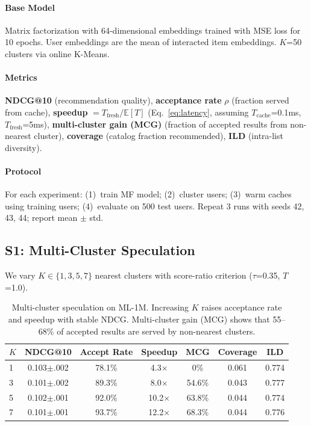 \documentclass{article}
\begin{document}
\paragraph{Base Model} Matrix factorization with 64-dimensional embeddings trained with MSE loss for 10 epochs. User embeddings are the mean of interacted item embeddings. $K$=50 clusters via online K-Means.

\paragraph{Metrics} \textbf{NDCG@10} (recommendation quality), \textbf{acceptance rate} $\rho$ (fraction served from cache), \textbf{speedup} $= T_{\text{fresh}} / \mathbb{E}[T]$ (Eq.~\ref{eq:latency}, assuming $T_{\text{cache}}$=0.1ms, $T_{\text{fresh}}$=5ms), \textbf{multi-cluster gain (MCG)} (fraction of accepted results from non-nearest cluster), \textbf{coverage} (catalog fraction recommended), \textbf{ILD} (intra-list diversity).

\paragraph{Protocol} For each experiment: (1)~train MF model; (2)~cluster users; (3)~warm caches using training users; (4)~evaluate on 500 test users. Repeat 3 runs with seeds 42, 43, 44; report mean $\pm$ std.

\subsection{S1: Multi-Cluster Speculation}
\label{sec:exp_s1}

We vary $K \in \{1, 3, 5, 7\}$ nearest clusters with score-ratio criterion ($\tau$=0.35, $T$=1.0).

\begin{table}[t]
\centering
\caption{Multi-cluster speculation on ML-1M. Increasing $K$ raises acceptance rate and speedup with stable NDCG. Multi-cluster gain (MCG) shows that 55--68\% of accepted results are served by non-nearest clusters.}
\label{tab:s1}
\small
\begin{tabular}{lcccccc}
\toprule
$K$ & NDCG@10 & Accept Rate & Speedup & MCG & Coverage & ILD \\
\midrule
1 & 0.103$\pm$.002 & 78.1\% & 4.3$\times$ & 0\% & 0.061 & 0.774 \\
3 & 0.101$\pm$.002 & 89.3\% & 8.0$\times$ & 54.6\% & 0.043 & 0.777 \\
5 & 0.102$\pm$.001 & 92.0\% & 10.2$\times$ & 63.8\% & 0.044 & 0.774 \\
7 & 0.101$\pm$.001 & 93.7\% & 12.2$\times$ & 68.3\% & 0.044 & 0.776 \\
\bottomrule
\end{tabular}
\end{table}
\end{document}
